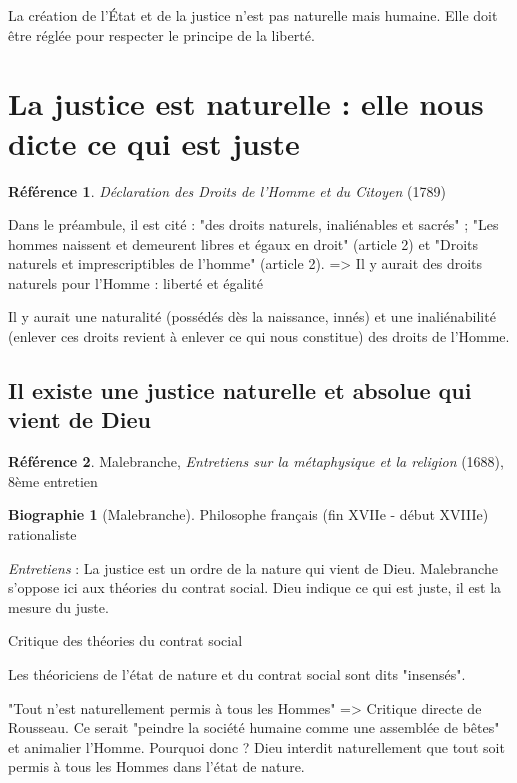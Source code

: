 \documentclass[french]{book}
\theoremstyle{definition}
\newtheorem*{refe}{Référence}
\newtheorem*{bio}{Biographie}
\begin{document}
La création de l'État et de la justice n'est pas naturelle mais humaine. Elle doit être réglée pour respecter le principe de la liberté.

\section{La justice est naturelle : elle nous dicte ce qui est juste}

\begin{refe}
	\textit{Déclaration des Droits de l'Homme et du Citoyen} (1789)
\end{refe}

Dans le préambule, il est cité : "des droits naturels, inaliénables et sacrés" ; "Les hommes naissent et demeurent libres et égaux en droit" (article 2) et "Droits naturels et imprescriptibles de l'homme" (article 2).
=> Il y aurait des droits naturels pour l'Homme : liberté et égalité

Il y aurait une naturalité (possédés dès la naissance, innés) et une inaliénabilité (enlever ces droits revient à enlever ce qui nous constitue) des droits de l'Homme.

\subsection{Il existe une justice naturelle et absolue qui vient de Dieu}

\begin{refe}
	Malebranche, \textit{Entretiens sur la métaphysique et la religion} (1688), 8ème entretien
\end{refe}

\begin{bio}[Malebranche]
	Philosophe français (fin XVIIe - début XVIIIe) rationaliste
\end{bio}

\textit{Entretiens} : La justice est un ordre de la nature qui vient de Dieu. Malebranche s'oppose ici aux théories du contrat social. Dieu indique ce qui est juste, il est la mesure du juste.

Critique des théories du contrat social

Les théoriciens de l'état de nature et du contrat social sont dits "insensés".

"Tout n'est naturellement permis à tous les Hommes" => Critique directe de Rousseau. Ce serait "peindre la société humaine comme une assemblée de bêtes" et animalier l'Homme.
Pourquoi donc ?
Dieu interdit naturellement que tout soit permis à tous les Hommes dans l'état de nature.
\end{document}
